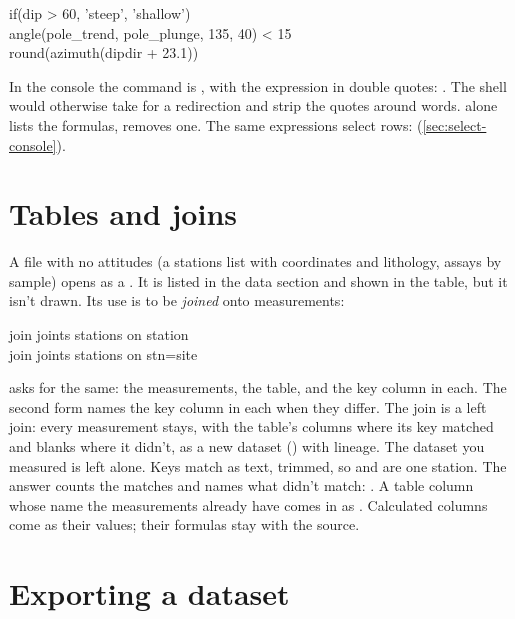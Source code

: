 \begin{center}\small\ttfamily
if(dip > 60, 'steep', 'shallow')\\
angle(pole\_trend, pole\_plunge, 135, 40) < 15\\
round(azimuth(dipdir + 23.1))
\end{center}

\noindent In the console the command is , with the expression in double quotes:
. The shell would otherwise take \code{>} for a redirection and strip the
quotes around words.  alone lists the formulas,  removes one. The same
expressions select rows:  (\cref{sec:select-console}).

\section{Tables and joins}\label{sec:tables}

A file with no attitudes (a stations list with coordinates and lithology, assays by sample) opens as a
. It is listed in the data section and shown in the table, but it isn't drawn. Its use is to
be \emph{joined} onto measurements:

\begin{center}\small\ttfamily
join joints stations on station\\
join joints stations on stn=site
\end{center}

\noindent {} asks for the same: the measurements, the table, and the key column
in each. The second form names the key column in each when they differ. The join is a left join: every
measurement stays, with the table's columns where its key matched and blanks where it didn't, as a new
dataset () with lineage. The dataset you measured is left alone. Keys match as text,
trimmed, so  and  are one station. The answer counts the matches and names what
didn't match:
. A table column whose name the measurements already have comes
in as . Calculated columns come as their values; their formulas stay with the source.

\section{Exporting a dataset}\label{sec:data-export}


